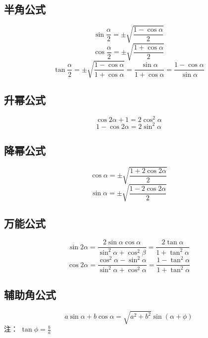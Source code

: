 \subsection{半角公式}
\begin{equation}
\sin\frac{\alpha}{2} = \pm\sqrt{\frac{1-\cos\alpha}{2}}
\end{equation}
\begin{equation}
\cos\frac{\alpha}{2}= \pm\sqrt{\frac{1+\cos\alpha}{2}}
\end{equation}
\begin{equation}
\tan\frac{\alpha}{2} = \pm\sqrt{\frac{1-\cos\alpha}{1+\cos\alpha}} = \frac{\sin\alpha}{1+\cos\alpha} = \frac{1-\cos\alpha}{\sin\alpha}
\end{equation}

\subsection{升幂公式}
\begin{equation}
\cos2\alpha + 1 = 2\cos^2\alpha
\end{equation}
\begin{equation}
1-\cos2\alpha = 2\sin^2\alpha
\end{equation}

\subsection{降幂公式}
\begin{equation}
\cos\alpha = \pm\sqrt{\frac{1+2\cos2\alpha}{2}}
\end{equation}
\begin{equation}
\sin\alpha = \pm\sqrt{\frac{1-2\cos2\alpha}{2}}
\end{equation}

\subsection{万能公式}
\begin{equation}
\sin2\alpha = \frac{2\sin\alpha \cos\alpha}{\sin^2\alpha + \cos^2\beta} = \frac{2\tan\alpha}{1+\tan^2\alpha}
\end{equation}
\begin{equation}
\cos2\alpha = \frac{\cos^2\alpha-\sin^2\alpha}{\sin^2\alpha+\cos^2\alpha} = \frac{1-\tan^2\alpha}{1+\tan^2\alpha}
\end{equation}

\subsection{辅助角公式}
\begin{equation}
a\sin\alpha + b\cos\alpha = \sqrt{a^2+b^2}\sin(\alpha + \phi)
\end{equation}
注： $\tan\phi = \frac{b}{a}$


